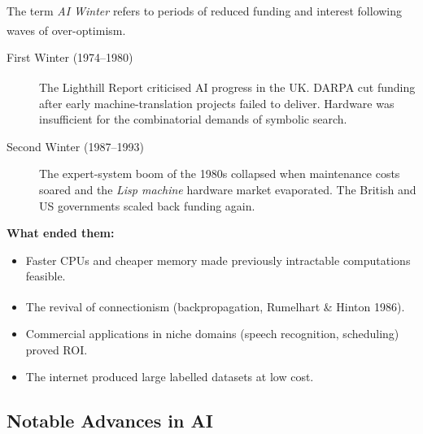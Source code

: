     \begin{tcbitemize}[ skin=sectionraster ]
        \tcbitem[title={AI Winter: Boom, Bust, and Revival}, raster multicolumn=6]
        The term \emph{AI Winter} refers to periods of reduced funding and interest following waves of over-optimism.\textsuperscript{\cite{adjaouteAI2024}}

        \begin{description}
            \item[First Winter (1974--1980)] The Lighthill Report\textsuperscript{\cite{lighthillArtificialIntelligenceSurvey1973}} criticised AI progress in the UK. DARPA cut funding after early machine-translation projects failed to deliver. Hardware was insufficient for the combinatorial demands of symbolic search.
            \item[Second Winter (1987--1993)] The expert-system boom of the 1980s collapsed when maintenance costs soared and the \emph{Lisp machine} hardware market evaporated. The British and US governments scaled back funding again.
        \end{description}

        \textbf{What ended them:}
        \begin{itemize}
            \item Faster CPUs and cheaper memory made previously intractable computations feasible.
            \item The revival of connectionism (backpropagation, Rumelhart \& Hinton 1986)\textsuperscript{\cite{rumelhartLearningRepresentationsBackpropagating1986}}.
            \item Commercial applications in niche domains (speech recognition, scheduling) proved ROI.
            \item The internet produced large labelled datasets at low cost.
        \end{itemize}
    \end{tcbitemize}

    \subsection{Notable Advances in AI}

